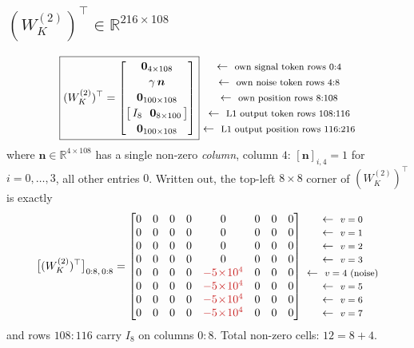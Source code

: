 \documentclass[11pt]{article}
\newcommand{\R}{\mathbb{R}}
\newcommand{\Wk}{W_K}
\newcommand{\rowlab}[1]{\ \leftarrow\ \text{\footnotesize #1}}
\begin{document}
\subsection{$(\Wk^{(2)})^\top\in\R^{216\times108}$}
\begin{equation}
\boxed{
(\Wk^{(2)})^\top=
\begin{bmatrix}
\bm{0}_{4\times108}\\[2pt]
\gamma\,\bm{n}\\[2pt]
\bm{0}_{100\times108}\\[2pt]
\bigl[\,I_{8}\ \ \bm{0}_{8\times100}\,\bigr]\\[2pt]
\bm{0}_{100\times108}
\end{bmatrix}}
\begin{matrix}
\rowlab{own signal token rows $0{:}4$}\\[2pt]
\rowlab{own noise token rows $4{:}8$}\\[2pt]
\rowlab{own position rows $8{:}108$}\\[2pt]
\rowlab{L1 output token rows $108{:}116$}\\[2pt]
\rowlab{L1 output position rows $116{:}216$}
\end{matrix}
\end{equation}
where $\bm{n}\in\R^{4\times108}$ has a single non-zero \emph{column}, column $4$:
$[\bm{n}]_{i,4}=1$ for $i=0,\dots,3$, all other entries $0$. Written out, the top-left
$8\times8$ corner of $(\Wk^{(2)})^\top$ is exactly
\begin{equation}
\bigl[(\Wk^{(2)})^\top\bigr]_{0:8,\,0:8}=
\begin{bmatrix}
0&0&0&0&0&0&0&0\\
0&0&0&0&0&0&0&0\\
0&0&0&0&0&0&0&0\\
0&0&0&0&0&0&0&0\\
0&0&0&0&\textcolor{hl}{-5\!\times\!10^{4}}&0&0&0\\
0&0&0&0&\textcolor{hl}{-5\!\times\!10^{4}}&0&0&0\\
0&0&0&0&\textcolor{hl}{-5\!\times\!10^{4}}&0&0&0\\
0&0&0&0&\textcolor{hl}{-5\!\times\!10^{4}}&0&0&0
\end{bmatrix}
\begin{matrix}
\rowlab{$v=0$}\\ \rowlab{$v=1$}\\ \rowlab{$v=2$}\\ \rowlab{$v=3$}\\
\rowlab{$v=4$ (noise)}\\ \rowlab{$v=5$}\\ \rowlab{$v=6$}\\ \rowlab{$v=7$}
\end{matrix}
\end{equation}
and rows $108{:}116$ carry $I_8$ on columns $0{:}8$. Total non-zero cells: $12=8+4$.
\end{document}
